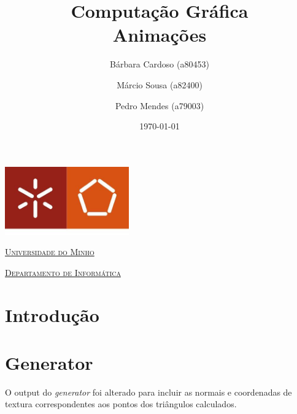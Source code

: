 \documentclass[a4paper]{article}
\begin{document}
\title{Computação Gráfica\\ Animações}
\author{Bárbara Cardoso (a80453) \and Márcio Sousa (a82400) \and Pedro Mendes (a79003)}
\date{\today}

\begin{titlepage}

    \thispagestyle{empty}
    \begin{center}
        \begin{minipage}{0.75\linewidth}
            \centering
            \includegraphics[width=0.4\textwidth]{eng.jpeg}\par\vspace{1cm}
            \vspace{1.5cm}
            \href{https://www.uminho.pt/PT}{\scshape\LARGE Universidade do Minho} \par
            \vspace{1cm}
            \href{https://www.di.uminho.pt/}{\scshape\Large Departamento de Informática} \par
            \vspace{1.5cm}

            \maketitle
        \end{minipage}
    \end{center}

\end{titlepage}

\tableofcontents

\pagebreak

\section{Introdução}

\section{Generator}

O output do \textit{generator} foi alterado para incluir as normais e coordenadas de textura correspondentes aos pontos dos triângulos calculados.
\end{document}

